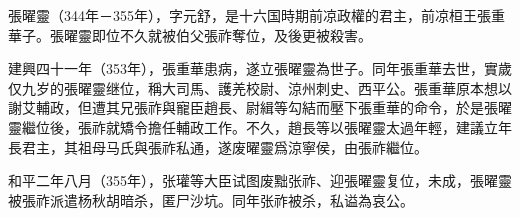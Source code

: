 張曜靈（344年－355年），字元舒，是十六国時期前凉政權的君主，前凉桓王張重華子。張曜靈即位不久就被伯父張祚奪位，及後更被殺害。

建興四十一年（353年），張重華患病，遂立張曜靈為世子。同年張重華去世，實歲仅九岁的張曜靈继位，稱大司馬、護羌校尉、涼州刺史、西平公。張重華原本想以謝艾輔政，但遭其兄張祚與寵臣趙長、尉緝等勾結而壓下張重華的命令，於是張曜靈繼位後，張祚就矯令擔任輔政工作。不久，趙長等以張曜靈太過年輕，建議立年長君主，其祖母马氏與張祚私通，遂废曜靈爲涼寧侯，由張祚繼位。

和平二年八月（355年），张瓘等大臣试图废黜张祚、迎張曜靈复位，未成，張曜靈被張祚派遣杨秋胡暗杀，匿尸沙坑。同年张祚被杀，私谥為哀公。






